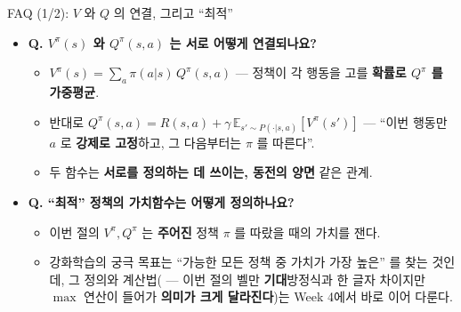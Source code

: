 \begin{frame}{FAQ (1/2): $V$ 와 $Q$ 의 연결, 그리고 ``최적''}
  \begin{itemize}
    \item \textbf{Q. $V^\pi(s)$ 와 $Q^\pi(s,a)$ 는 서로 어떻게
      연결되나요?}
      \begin{itemize}
        \item $V^\pi(s) = \sum_a \pi(a|s)\,Q^\pi(s,a)$ --- 정책이
          각 행동을 고를 \textbf{확률로 $Q^\pi$ 를 가중평균}.
        \item 반대로 $Q^\pi(s,a) = R(s,a) + \gamma\,
          \mathbb{E}_{s'\sim P(\cdot|s,a)}[V^\pi(s')]$ --- ``이번
          행동만 $a$ 로 \textbf{강제로 고정}하고, 그 다음부터는
          $\pi$ 를 따른다''.
        \item 두 함수는 \textbf{서로를 정의하는 데 쓰이는, 동전의
          양면} 같은 관계.
      \end{itemize}
    \item \textbf{Q. ``최적'' 정책의 가치함수는 어떻게
      정의하나요?}
      \begin{itemize}
        \item 이번 절의 $V^\pi, Q^\pi$ 는 \textbf{주어진} 정책
          $\pi$ 를 따랐을 때의 가치를 잰다.
        \item 강화학습의 궁극 목표는 ``가능한 모든 정책 중 가치가
          가장 높은'' 를 찾는 것인데, 그
          정의와 계산법( ---
          이번 절의 벨만 \textbf{기대}방정식과 한 글자 차이지만
          $\max$ 연산이 들어가 \textbf{의미가 크게 달라진다})는
          Week 4에서 바로 이어 다룬다.
      \end{itemize}
  \end{itemize}
\end{frame}
